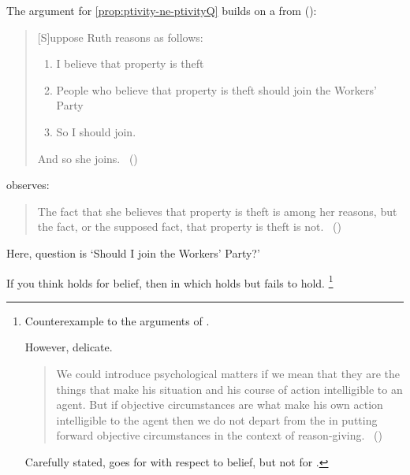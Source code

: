 \begin{note}
  The argument for \autoref{prop:ptivity-ne-ptivityQ} builds on a  from \citeauthor{Hyman:1999tm} (\citeyear{Hyman:1999tm}):

  \begin{quote}
    [S]uppose Ruth reasons as follows:

    \begin{enumerate}[label=, noitemsep]
    \item
      I believe that property is theft
    \item
      People who believe that property is theft should join the Workers’ Party
    \item
      So I should join.
    \end{enumerate}

    And so she joins.%
    \mbox{ }\hfill\mbox{(\citeyear[444]{Hyman:1999tm})}
  \end{quote}

  \citeauthor{Hyman:1999tm} observes:

  \begin{quote}
    The fact that she believes that property is theft is among her reasons, but the fact, or the supposed fact, that property is theft is not.\newline
    \mbox{ }\hfill\mbox{(\citeyear[444]{Hyman:1999tm})}
  \end{quote}

  Here, question is `Should I join the Workers’ Party?'

  If you think \ptivity{} holds for belief, then \scen{} in which \ptivity{} holds but \ptivityQ{} fails to hold.%
  \footnote{
    Counterexample to the arguments of \citeauthor{Collins:1997wn}.

    However, delicate.

    \begin{quote}
      We could introduce psychological matters if we mean that they are the things that make his situation and his course of action intelligible to an agent.
      But if objective circumstances are what make his own action intelligible to the agent then we do not depart from the \agpe{} in putting forward objective circumstances in the context of reason-giving.%
      \mbox{ }\hfill\mbox{(\citeyear[120]{Collins:1997wn})}
    \end{quote}

    Carefully stated, \citeauthor{Collins:1997wn} goes for \ptivity{} with respect to belief, but not for  \ptivityQ{}.

}
\end{note}
